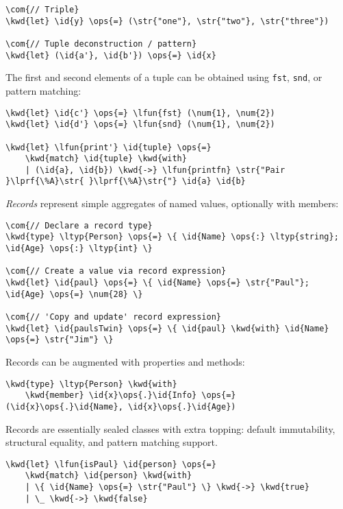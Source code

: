 \documentclass[10pt,landscape]{article}
\newcommand{\id}[1]{\textcolor[HTML]{000000}{#1}}
\newcommand{\str}[1]{\textcolor[HTML]{A31515}{#1}}
\newcommand{\kwd}[1]{\textcolor[HTML]{0000FF}{#1}}
\newcommand{\com}[1]{\textcolor[HTML]{008000}{#1}}
\newcommand{\ops}[1]{\textcolor[HTML]{000000}{#1}}
\newcommand{\num}[1]{\textcolor[HTML]{000000}{#1}}
\newcommand{\ltyp}[1]{\textcolor[HTML]{2B91AF}{#1}}
\newcommand{\lfun}[1]{\textcolor[HTML]{0000A0}{#1}}
\newcommand{\lprf}[1]{\textcolor[HTML]{2B91AF}{#1}}
\begin{document}
\begin{multicols}{3}
\begin{Verbatim}[commandchars=\\\{\}]
\com{// Triple}
\kwd{let} \id{y} \ops{=} (\str{"one"}, \str{"two"}, \str{"three"}) 

\com{// Tuple deconstruction / pattern}
\kwd{let} (\id{a'}, \id{b'}) \ops{=} \id{x}

\end{Verbatim}



The first and second elements of a tuple can be obtained using \texttt{fst}, \texttt{snd}, or pattern matching:
\begin{Verbatim}[commandchars=\\\{\}]
\kwd{let} \id{c'} \ops{=} \lfun{fst} (\num{1}, \num{2})
\kwd{let} \id{d'} \ops{=} \lfun{snd} (\num{1}, \num{2})

\kwd{let} \lfun{print'} \id{tuple} \ops{=}
    \kwd{match} \id{tuple} \kwd{with}
    | (\id{a}, \id{b}) \kwd{->} \lfun{printfn} \str{"Pair }\lprf{\%A}\str{ }\lprf{\%A}\str{"} \id{a} \id{b}

\end{Verbatim}



\emph{Records} represent simple aggregates of named values, optionally with members:
\begin{Verbatim}[commandchars=\\\{\}]
\com{// Declare a record type}
\kwd{type} \ltyp{Person} \ops{=} \{ \id{Name} \ops{:} \ltyp{string}; \id{Age} \ops{:} \ltyp{int} \}

\com{// Create a value via record expression}
\kwd{let} \id{paul} \ops{=} \{ \id{Name} \ops{=} \str{"Paul"}; \id{Age} \ops{=} \num{28} \}

\com{// 'Copy and update' record expression}
\kwd{let} \id{paulsTwin} \ops{=} \{ \id{paul} \kwd{with} \id{Name} \ops{=} \str{"Jim"} \}

\end{Verbatim}



Records can be augmented with properties and methods:
\begin{Verbatim}[commandchars=\\\{\}]
\kwd{type} \ltyp{Person} \kwd{with}
    \kwd{member} \id{x}\ops{.}\id{Info} \ops{=} (\id{x}\ops{.}\id{Name}, \id{x}\ops{.}\id{Age})

\end{Verbatim}



Records are essentially sealed classes with extra topping: default immutability, structural equality, and pattern matching support.
\begin{Verbatim}[commandchars=\\\{\}]
\kwd{let} \lfun{isPaul} \id{person} \ops{=}
    \kwd{match} \id{person} \kwd{with}
    | \{ \id{Name} \ops{=} \str{"Paul"} \} \kwd{->} \kwd{true}
    | \_ \kwd{->} \kwd{false}


\end{Verbatim}
\end{multicols}
\end{document}
